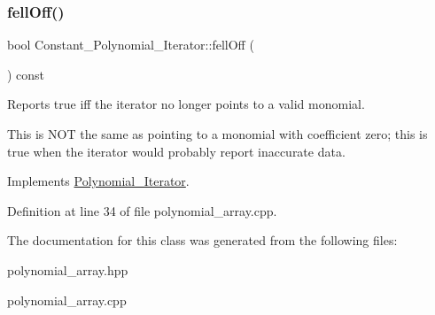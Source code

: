 \subsubsection{\texorpdfstring{fell\+Off()}{fellOff()}}
{\footnotesize\ttfamily bool Constant\+\_\+\+Polynomial\+\_\+\+Iterator\+::fell\+Off (\begin{DoxyParamCaption}{ }\end{DoxyParamCaption}) const\hspace{0.3cm}{\ttfamily [virtual]}}



Reports true iff the iterator no longer points to a valid monomial. 

This is N\+OT the same as pointing to a monomial with coefficient zero; this is true when the iterator would probably report inaccurate data. 

Implements \hyperlink{class_polynomial___iterator_ac571e120134088d6067718bbad513e2d}{Polynomial\+\_\+\+Iterator}.



Definition at line 34 of file polynomial\+\_\+array.\+cpp.



The documentation for this class was generated from the following files\+:\begin{DoxyCompactItemize}
\item 
polynomial\+\_\+array.\+hpp\item 
polynomial\+\_\+array.\+cpp\end{DoxyCompactItemize}
